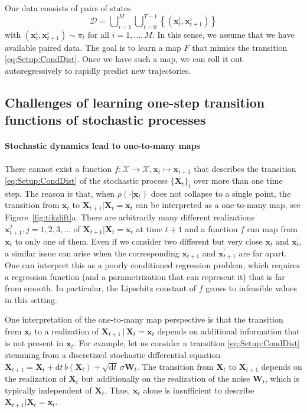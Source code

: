 \documentclass{article}
\theoremstyle{plain}
\theoremstyle{definition}
\theoremstyle{remark}
\newcommand{\x}{\bm{x}}
\newcommand{\X}{\bm{X}}
\newcommand{\bfx}{\bm{x}}
\newcommand{\Dcal}{\mathcal{D}}
\newcommand{\W}{\boldsymbol{W}}
\begin{document}
Our data consists of pairs of states
\begin{equation}
  \label{eq:Dcal}
  \Dcal = \bigcup\nolimits_{i = 1}^M \bigcup\nolimits_{t = 0}^{T-1}
  \left\{ (\x_{t}^{i}, \x_{t+1}^{i})\right\}
\end{equation}
with $(\x_{t}^{i}, \x_{t+1}^{i}) \sim \pi_t$ for all $i = 1, \dots, M$.
In this sense, we assume that we have available paired data. The goal is to learn a map $F$ that mimics the transition \eqref{eq:Setup:CondDist}. Once we have such a map, we can roll it out autoregressively to rapidly predict new trajectories.

\subsection{Challenges of learning one-step transition functions of stochastic processes}\label{sec:Challenges}
\paragraph{Stochastic dynamics lead to one-to-many maps}
There cannot exist a function $f : \mathcal X \to \mathcal X, \x_t \mapsto \x_{t + 1}$ that describes the transition \eqref{eq:Setup:CondDist} of the stochastic process $\{\X_t\}_t$ over more than one time step.
The reason is that, when $\rho(\cdot | \x_t)$ does not collapse to a single point, the transition from $\x_t$ to $\X_{t + 1} | \X_t = \x_t$ can be interpreted as a one-to-many map, see Figure~\ref{fig:tikzlift}a. There are arbitrarily many different realizations $\x_{t + 1}^{j}, j = 1, 2, 3, \dots $ of $\X_{t + 1} | \X_t = \x_t$ at time $t + 1$ and a function $f$ can map from $\x_t$ to only one of them. Even if we consider two different but very close $\bfx_t$ and $\bfx_t^{\prime}$, a similar issue can arise when the corresponding $\bfx_{t + 1}$ and $\bfx_{t + 1}^{\prime}$ are far apart. One can interpret this as a poorly conditioned regression problem, which requires a regression function (and a parametrization that can represent it) that is far from smooth. In particular, the Lipschitz constant of $f$ grows to infeasible values in this setting.

One interpretation of the one-to-many map perspective is that the transition from $\x_t$ to a realization of $\X_{t + 1} \,|\, \X_t = \x_t$ depends on additional information that is not present in $\x_t$.
For example, let us consider a transition \eqref{eq:Setup:CondDist} stemming from a discretized stochastic differential equation $\X_{t + 1} = \X_t + \mathrm d t\, b(\X_t) + \sqrt{\mathrm d t}\,\sigma \W_t$. 
The transition from $\X_t$ to $\X_{t + 1}$ depends on the realization of $\X_t$ but additionally on the realization of the noise $\W_t$, which is typically independent of $\X_t$. Thus, $\x_t$ alone is insufficient to describe $\X_{t + 1} | \X_t = \x_t$.
\end{document}
